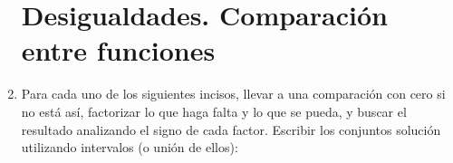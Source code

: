 \documentclass[12pt]{article}
\theoremstyle{definition}
\begin{document}
\begin{enumerate}
\noindent
\section{Desigualdades. Comparación entre funciones}
\item  Para cada uno de los siguientes incisos, llevar a una comparación con cero si no está así, factorizar lo que haga falta y lo que se pueda, y buscar el resultado analizando el signo de cada factor. Escribir los conjuntos solución utilizando intervalos (o unión de ellos):
\begin{enumerate}


\end{enumerate}
\end{enumerate}
\end{document}

